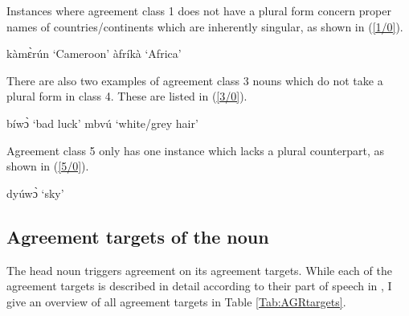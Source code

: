 \noindent Instances where agreement class 1 does not have a plural form concern proper names of countries/continents which are inherently singular, as shown in (\ref{1/0}).

\begin{exe}
\ex\label{1/0}
\begin{xlist}
\ex kàmɛ̀rún `Cameroon'
\ex àfríkà `Africa'
\end{xlist}
\end{exe}

\noindent There are also two examples of agreement class 3 nouns which do not take a plural form in class 4. These are listed in (\ref{3/0}).

\begin{exe}
\ex\label{3/0}
\begin{xlist}
\ex bíwɔ̀ `bad luck'
\ex mbvú `white/grey hair'
\end{xlist}
\end{exe}

\noindent Agreement class 5 only has one instance which lacks a plural counterpart, as shown in (\ref{5/0}).

\begin{exe}
\ex\label{5/0}
 dyúwɔ̀ `sky'
\end{exe}






\subsection{Agreement targets of the noun}
\label{sec:AGRtargets}

The head noun triggers agreement on its agreement targets. While each of the agreement targets is described in detail according to their part of speech in , I give an overview of all agreement targets in Table \ref{Tab:AGRtargets}.


